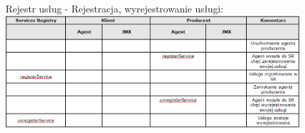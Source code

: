 \documentclass[a4paper,12pt]{article}
\begin{document}
\begin{landscape}

\begin{figure}[!h]
Rejestr usług - Rejestracja, wyrejestrowanie usługi:
\centering
\includegraphics[width=24cm, keepaspectratio]{gfx/PlatformaWymianyDobr-img13.png}
\end{figure}

\end{landscape}
\end{document}
